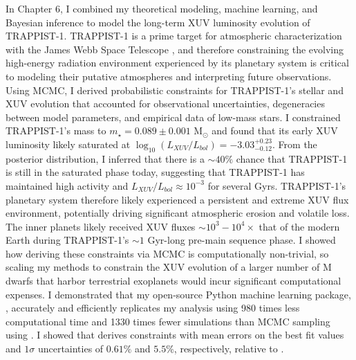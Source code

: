 In Chapter 6, I combined my theoretical modeling, machine learning, and Bayesian inference to model the long-term XUV luminosity evolution of TRAPPIST-1. TRAPPIST-1 is a prime target for atmospheric characterization with the James Webb Space Telescope \citep{Morley2017,Lustig2019}, and therefore constraining the evolving high-energy radiation environment experienced by its planetary system is critical to modeling their putative atmospheres and interpreting future observations. Using MCMC, I derived probabilistic constraints for TRAPPIST-1's stellar and XUV evolution that accounted for observational uncertainties, degeneracies between model parameters, and empirical data of low-mass stars. I constrained TRAPPIST-1's mass to $m_{\star} = 0.089 \pm{0.001}$ M$_{\odot}$ and found that its early XUV luminosity likely saturated at $\log_{10}(L_{XUV}/L_{bol}) = -3.03^{+0.23}_{-0.12}$. From the posterior distribution, I inferred that there is a ${\sim}40\%$ chance that TRAPPIST-1 is still in the saturated phase today, suggesting that TRAPPIST-1 has maintained high activity and $L_{XUV}/L_{bol} \approx 10^{-3}$ for several Gyrs. TRAPPIST-1's planetary system therefore likely experienced a persistent and extreme XUV flux environment, potentially driving significant atmospheric erosion and volatile loss. The inner planets likely received XUV fluxes ${\sim}10^3 - 10^4\times$ that of the modern Earth during TRAPPIST-1's ${\sim}1$ Gyr-long pre-main sequence phase. I showed how deriving these constraints via MCMC is computationally non-trivial, so scaling my methods to constrain the XUV evolution of a larger number of M dwarfs that harbor terrestrial exoplanets would incur significant computational expenses. I demonstrated that my open-source Python machine learning package, \approxposterior, accurately and efficiently replicates my analysis using 980 times less computational time and 1330 times fewer simulations than MCMC sampling using \emcee. I showed that \approxposterior derives constraints with mean errors on the best fit values and $1\sigma$ uncertainties of $0.61\%$ and $5.5\%$, respectively, relative to \emcee.

